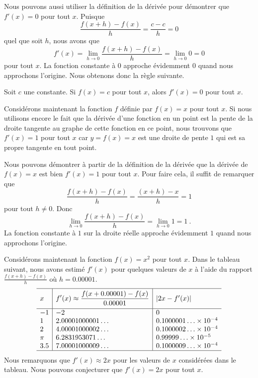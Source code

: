 {Nous pouvons aussi utiliser la définition de la dérivée pour démontrer que
$f'(x) = 0$ pour tout $x$.  Puisque
\[
\frac{f(x+h)-f(x)}{h} = \frac{c-c}{h} = 0
\]
quel que soit $h$, nous avons que
\[
f'(x) = \lim_{h\rightarrow 0} \frac{f(x+h)-f(x)}{h}
= \lim_{h\rightarrow 0} 0 = 0
\]
pour tout $x$.  La fonction constante à $0$ approche évidemment $0$
quand nous approchons l'origine.  Nous obtenons donc la règle suivante.

\begin{focus}{\prp}
Soit $c$ une constante.  Si $f(x) = c$ pour tout $x$, alors
$f'(x) = 0$ pour tout $x$.
\end{focus}

Considérons maintenant la fonction $f$ définie par $f(x) = x$ pour
tout $x$.  Si nous utilisons
encore le fait que la dérivée d'une fonction en un point est la pente
de la droite tangente au graphe de cette fonction en ce point, nous
trouvons que $f'(x) = 1$ pour tout $x$ car $y = f(x)= x$ est une 
droite de pente $1$ qui est sa propre tangente en tout point.

Nous pouvons démontrer à partir de la définition de la dérivée que la
dérivée de $f(x) = x$ est bien $f'(x) = 1$ pour tout $x$.  Pour faire 
cela, il suffit de remarquer que
\[
\frac{f(x+h)-f(x)}{h} = \frac{(x+h)-x}{h} = 1
\]
pour tout $h \neq 0$.  Donc
\[
\lim_{h\rightarrow 0} \frac{f(x+h)-f(x)}{h} = \lim_{h\rightarrow 0} 1
= 1 \ .
\]
La fonction constante à $1$ sur la droite réelle approche
évidemment $1$ quand nous approchons l'origine.

Considérons maintenant la fonction $f(x)=x^2$ pour tout $x$.  Dans le
tableau suivant, nous avons estimé $f'(x)$ pour quelques valeurs de $x$ à
l'aide du rapport $\displaystyle \frac{f(x+h)-f(x)}{h}$ où
$h = 0.00001$.
\[
\begin{array}{l|l|l}
\hline
x & \rule{0em}{1.7em}
\displaystyle f'(x) \approx \frac{f(x+0.00001)-f(x)}{0.00001}
& |2x - f'(x)| \\[0.8em]
\hline
-1 & -2 & 0 \\
1 & 2.00001000001\ldots & 0.1000001\ldots \times 10^{-4} \\
2 & 4.00001000002\ldots & 0.1000002\ldots \times 10^{-4} \\
\pi & 6.2831953071\ldots & 0.99999\ldots \times 10^{-5} \\
3.5 & 7.00001000009\ldots & 0.1000009\ldots \times 10^{-4} \\
\hline
\end{array}
\]
Nous remarquons que $f'(x) \approx 2x$ pour les valeurs de $x$ considérées
dans le tableau.  Nous pouvons conjecturer que $f'(x) = 2x$ pour tout $x$.

}
